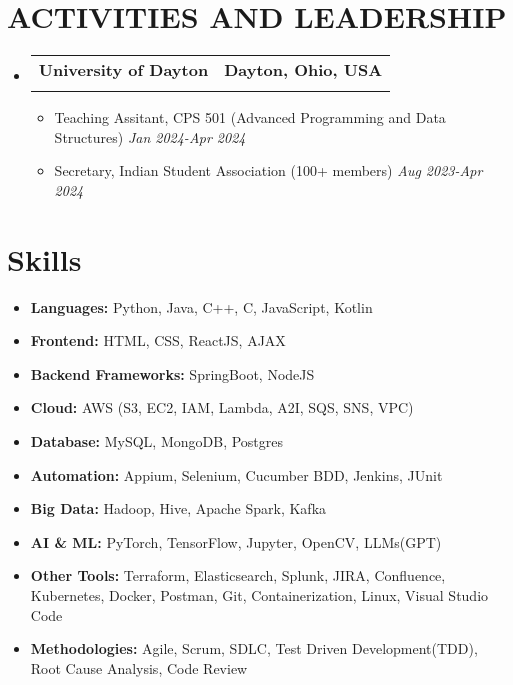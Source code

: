 \documentclass[letterpaper,11pt]{article}
\makeatletter
\newcommand{\resumeItem}[1]{\item\small{{#1 \vspace{-2pt}}}}
\newcommand{\resumeSubheading}[4]{\vspace{-2pt}\item\begin{tabular*}{0.97\textwidth}[t]{l@{\extracolsep{\fill}}r}\textbf{#1} & #2 \\\textit{\small#3} & \textit{\small #4} \\\end{tabular*}\vspace{-7pt}}
\newcommand{\resumeSubHeadingListStart}{\begin{itemize}[leftmargin=0.15in, label={}]}
\newcommand{\resumeSubHeadingListEnd}{\end{itemize}}
\newcommand{\resumeItemListStart}{\begin{itemize}}
\newcommand{\resumeItemListEnd}{\end{itemize}\vspace{-5pt}}
\makeatother
\begin{document}
\section{{\fontsize{9pt}{20pt}\selectfont \textbf{ACTIVITIES AND LEADERSHIP}}}
\resumeSubHeadingListStart
\resumeSubheading{University of Dayton}{\textbf{Dayton, Ohio, USA}}{}{}
\vspace{-17pt}
\resumeItemListStart
\resumeItem{Teaching Assitant, CPS 501 (Advanced Programming and Data Structures)} \hfill \textit{Jan 2024-Apr 2024}
\resumeItem{Secretary, Indian Student Association (100+ members)} \hfill \textit{Aug 2023-Apr 2024}
\resumeItemListEnd
\resumeSubHeadingListEnd
\vspace{-18pt}

\section{\textbf{Skills}}
\resumeSubHeadingListStart
\resumeItem{\textbf{Languages:} Python, Java, C++, C, JavaScript, Kotlin}
\resumeItem{\textbf{Frontend:} HTML, CSS, ReactJS, AJAX}
\resumeItem{\textbf{Backend Frameworks:} SpringBoot, NodeJS}
\resumeItem{\textbf{Cloud:} AWS (S3, EC2, IAM, Lambda, A2I, SQS, SNS, VPC)}
\resumeItem{\textbf{Database:} MySQL, MongoDB, Postgres}
\resumeItem{\textbf{Automation:} Appium, Selenium, Cucumber BDD, Jenkins, JUnit}
\resumeItem{\textbf{Big Data:} Hadoop, Hive, Apache Spark, Kafka}
\resumeItem{\textbf{AI \& ML:} PyTorch, TensorFlow, Jupyter, OpenCV, LLMs(GPT)}
\resumeItem{\textbf{Other Tools:} Terraform, Elasticsearch, Splunk, JIRA, Confluence, Kubernetes, Docker, Postman, Git, Containerization, Linux, Visual Studio Code}
\resumeItem{\textbf{Methodologies:} Agile, Scrum, SDLC, Test Driven Development(TDD), Root Cause Analysis, Code Review}
\resumeSubHeadingListEnd
\vspace{-10pt}
\end{document}
